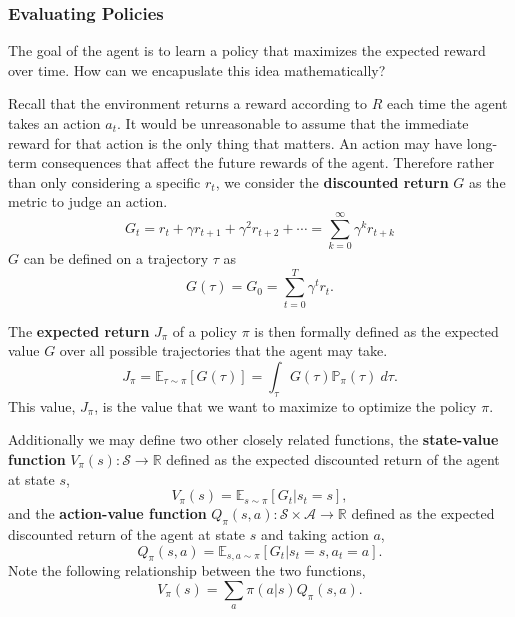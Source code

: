 \documentclass[12pt]{report}
\theoremstyle{definition}
\theoremstyle{remark}
\begin{document}
\subsubsection{Evaluating Policies}
The goal of the agent is to learn a policy that maximizes the expected reward over time. How can we encapuslate this idea mathematically?

Recall that the environment returns a reward according to $R$ each time the agent takes an action $a_t$. It would be unreasonable to assume that the immediate reward for that action is the only thing that matters. An action may have long-term consequences that affect the future rewards of the agent. Therefore rather than only considering a specific $r_t$, we consider the \textbf{discounted return} $G$ as the metric to judge an action.
\begin{equation}
    G_t = r_t + \gamma r_{t+1} + \gamma^2 r_{t+2} + \cdots = \sum_{k=0}^{\infty} \gamma^k r_{t+k}
\end{equation}
$G$ can be defined on a trajectory $\tau$ as
\begin{equation}
    G(\tau) = G_0 = \sum_{t=0}^{T} \gamma^t r_t.
\end{equation}

The \textbf{expected return} $J_\pi$ of a policy $\pi$ is then formally defined as the expected value $G$ over all possible trajectories that the agent may take.
\begin{equation}\label{eq:expected-return}
    J_\pi = \mathbb{E}_{\tau\sim\pi}[G(\tau)] = \int_{\tau} G(\tau)\mathbb{P}_\pi(\tau)\ d\tau.
\end{equation}
This value, $J_\pi$, is the value that we want to maximize to optimize the policy $\pi$.

Additionally we may define two other closely related functions, the \textbf{state-value function} $V_\pi(s): \mathcal{S} \to \mathbb{R}$ defined as the expected discounted return of the agent at state $s$,
\begin{equation}
    V_\pi(s) = \mathbb{E}_{s\sim\pi}[G_t | s_t = s],
\end{equation}
and the \textbf{action-value function} $Q_\pi(s, a): \mathcal{S} \times \mathcal{A} \to \mathbb{R}$ defined as the expected discounted return of the agent at state $s$ and taking action $a$,
\begin{equation}
    Q_\pi(s, a) = \mathbb{E}_{s, a\sim\pi}[G_t | s_t = s, a_t = a].
\end{equation}
Note the following relationship between the two functions,
\begin{equation}
    V_\pi(s) = \sum_a \pi(a | s) Q_\pi(s, a).
\end{equation}
\end{document}
